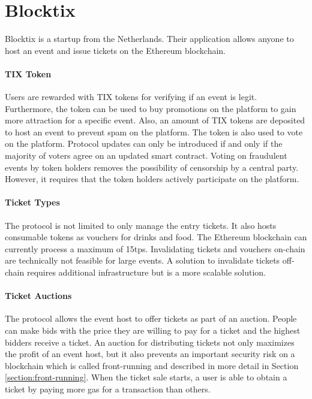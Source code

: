 
\section{Blocktix}

Blocktix \cite{blocktix-whitepaper} is a startup from the Netherlands. Their application allows anyone to host an event and issue tickets on the Ethereum blockchain. 

\paragraph{TIX Token}
Users are rewarded with TIX tokens for verifying if an event is legit. Furthermore, the token can be used to buy promotions on the platform to gain more attraction for a specific event. Also, an amount of TIX tokens are deposited to host an event to prevent spam on the platform. The token is also used to vote on the platform. Protocol updates can only be introduced if and only if the majority of voters agree on an updated smart contract. 
Voting on fraudulent events by token holders removes the possibility of censorship by a central party. However, it requires that the token holders actively participate on the platform. 

\paragraph{Ticket Types}
The protocol is not limited to only manage the entry tickets. It also hosts consumable tokens as vouchers for drinks and food. 
The Ethereum blockchain can currently process a maximum of 15tps. Invalidating tickets and vouchers on-chain are technically not feasible for large events. A solution to invalidate tickets off-chain requires additional infrastructure but is a more scalable solution. 

\paragraph{Ticket Auctions}
The protocol allows the event host to offer tickets as part of an auction. People can make bids with the price they are willing to pay for a ticket and the highest bidders receive a ticket. 
An auction for distributing tickets not only maximizes the profit of an event host, but it also prevents an important security risk on a blockchain which is called front-running and described in more detail in Section \ref{section:front-running}. When the ticket sale starts, a user is able to obtain a ticket by paying more gas for a transaction than others. 

